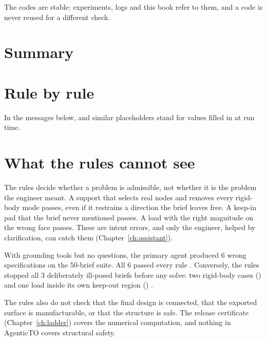 The codes are stable: experiments, logs and this book refer to them, and a code is never reused for a different
check.

\section{Summary}


\section{Rule by rule}
In the messages below,  and similar placeholders stand for values filled in at run time.



\section{What the rules cannot see}\label{sec:rulelimits}
The rules decide whether a problem is admissible, not whether it is the problem the engineer meant. A support that
selects real nodes and removes every rigid-body mode passes, even if it restrains a direction the brief leaves free. A
keep-in pad that the brief never mentioned passes. A load with the right magnitude on the wrong face passes. These are
intent errors, and only the engineer, helped by clarification, can catch them (Chapter~\ref{ch:assistant}).

\begin{evidencebox}
With grounding tools but no questions, the primary agent produced 6 wrong specifications on the 50-brief suite. All 6
passed every rule . Conversely, the rules stopped all 3 deliberately ill-posed briefs before any solve: two
rigid-body cases () and one load inside its own keep-out region () .
\end{evidencebox}

The rules also do not check that the final design is connected, that the exported surface is manufacturable, or that
the structure is safe. The release certificate (Chapter~\ref{ch:ladder}) covers the numerical computation, and nothing
in AgenticTO covers structural safety.
